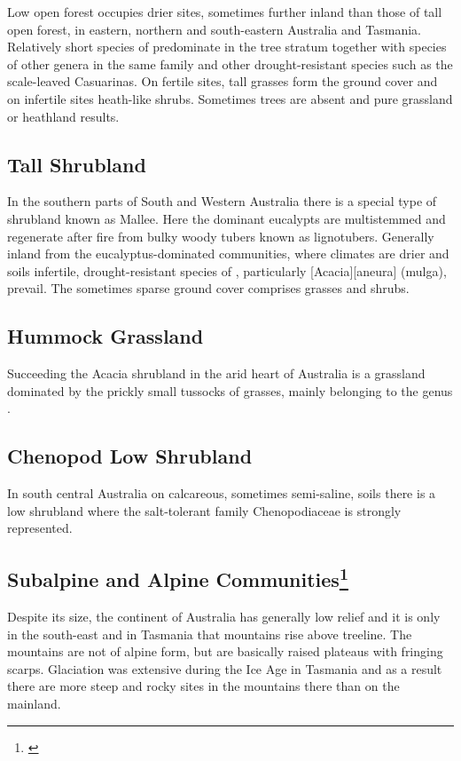 Low open forest occupies drier sites, sometimes further inland than those of tall open forest, in eastern, northern and south-eastern Australia and Tasmania.
Relatively short species of  predominate in the tree stratum together with species of other genera in the same family and other drought-resistant species such as the scale-leaved Casuarinas.
On fertile sites, tall grasses form the ground cover and on infertile sites heath-like shrubs.
Sometimes trees are absent and pure grassland or heathland results.

\subsection{Tall Shrubland}

In the southern parts of South and Western Australia there is a special type of shrubland known as Mallee.
Here the dominant eucalypts are multistemmed and regenerate after fire from bulky woody tubers known as lignotubers.
Generally inland from the eucalyptus-dominated communities, where climates are drier and soils infertile, drought-resistant species of , particularly [Acacia][aneura] (mulga), prevail.
The sometimes sparse ground cover comprises grasses and shrubs.

\subsection{Hummock Grassland}

Succeeding the Acacia shrubland in the arid heart of Australia is a grassland dominated by the prickly small tussocks of grasses, mainly belonging to the genus .

\subsection{Chenopod Low Shrubland}

In south central Australia on calcareous, sometimes semi-saline, soils there is a low shrubland where the salt-tolerant family Chenopodiaceae is strongly represented.

\subsection[Subalpine and Alpine Communities]{Subalpine and Alpine Communities\thinspace\footnote{\cite{harris1970alpine}}}

Despite its size, the continent of Australia has generally low relief and it is only in the south-east and in Tasmania that mountains rise above treeline.
The mountains are not of alpine form, but are basically raised plateaus with fringing scarps.
Glaciation was extensive during the Ice Age in Tasmania and as a result there are more steep and rocky sites in the mountains there than on the mainland.


